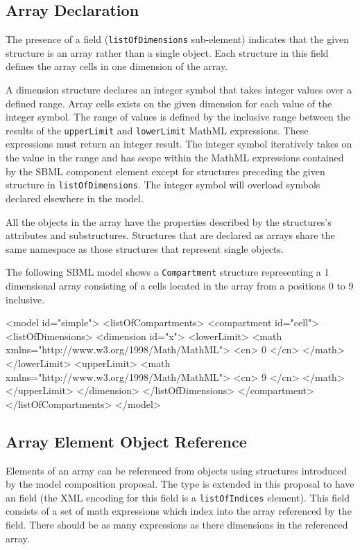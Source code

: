 \documentclass{cekarticle}
\begin{document}
\subsection{Array Declaration}
\label{sec:arraydec}
The presence of a  field
(\texttt{listOfDimensions} sub-element) indicates that the given
structure is an array rather than a single object.  Each  structure in this field defines
the array cells in one dimension of the array.

A dimension structure declares an integer symbol that takes integer values over a defined range.  
Array cells exists on the given dimension for each value of the integer symbol.  The range of values
is defined by the inclusive range between the results of the \texttt{upperLimit} and \texttt{lowerLimit}
MathML expressions.  These expressions must return an integer result.  The integer symbol iteratively takes on the
value in the range and has scope within the MathML expressions contained by the SBML component element
except for  structures preceding the given  structure in \texttt{listOfDimensions}.
The integer symbol will overload symbols declared elsewhere in the model.

All the objects in the
array have the properties described by the structures's
attributes and substructures.
Structures that are declared as arrays share the same namespace
as those structures that represent single objects.

The following SBML model shows a \texttt{Compartment}
structure representing a 1 dimensional array consisting of
a cells located in the array from a positions 0 to 9 inclusive.

\begin{example}
<model id="simple">
    <listOfCompartments>
        <compartment id="cell">
            <listOfDimensions>
                <dimension id="x">
                    <lowerLimit>
                        <math xmlns="http://www.w3.org/1998/Math/MathML">
                            <cn> 0 </cn>
                        </math>
                    </lowerLimit>
                    <upperLimit>
                        <math xmlns="http://www.w3.org/1998/Math/MathML">
                            <cn> 9 </cn>
                        </math>
                    </upperLimit>
                </dimension>
            </listOfDimensions>
        </compartment>
    </listOfCompartments>
</model>
\end{example}

\subsection{Array Element Object Reference}
\label{sec:arrayLinks}
Elements of an array can be referenced from objects using  structures introduced by the model composition proposal.
The  type is extended in this proposal to have an  field (the XML encoding for this field is a \texttt{listOfIndices} element).
This field consists of a set of math expressions which index into the array referenced by the  field.  There should be
as many expressions as there dimensions in the referenced array.
\end{document}
